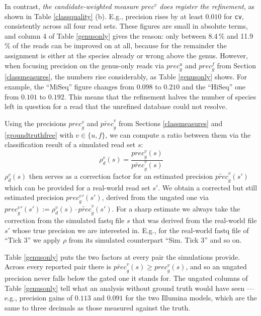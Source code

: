 \documentclass[pdflatex,sn-vancouver-num]{sn-jnl}
\begin{document}
    In contrast, \emph{the candidate-weighted measure $\mathit{prec}^v$ does register the refinement}, as shown in Table \ref{classquality} (b). E.g., precision rises by at least $0.010$ for \texttt{cv}, consistently across all four read sets. These figures are small in absolute terms, and column 4 of Table \ref{genusonly} gives the reason: only between 8.4\,\% and 11.9\,\% of the reads can be improved on at all, because for the remainder the assignment is either at the species already or wrong above the genus. However, when focusing precision on the genus-only reads via $\mathit{prec}^u_g$ and $\mathit{prec}^f_g$ from Section \ref{classmeasures}, the numbers rise considerably, as Table \ref{genusonly} shows. For example, the \enquote{MiSeq} figure changes from $0.098$ to $0.210$ and the \enquote{HiSeq} one from $0.101$ to $0.192$. This means that the refinement halves the number of species left in question for a read that the unrefined database could not resolve.

    Using the precisions $\mathit{prec}^v_g$ and $\widetilde{\mathit{prec}}^v_g$ from Sections \ref{classmeasures} and \ref{groundtruthfree} with $v \in \{u, f\}$, we can compute a ratio between them via the classification result of a simulated read set $s$:
\[ \rho^v_d(s) = \frac{\mathit{prec}^v_g(s)}{\widetilde{\mathit{prec}}^v_g(s)} \]
    $\rho^v_d(s)$ then serves as a correction factor for an estimated precision $\widetilde{\mathit{prec}}^v_g(s')$ which can be provided for a real-world read set $s'$. We obtain a corrected but still estimated precision $\mathit{prec}^{v}_g{}'(s')$, derived from the ungated one via $\mathit{prec}^{v}_g{}'(s') := \rho^v_d(s) \cdot \widetilde{\mathit{prec}}^v_g(s')$. For a sharp estimate we always take the correction from the simulated fastq file $s$ that was derived from the real-world file $s'$ whose true precision we are interested in. E.g., for the real-world fastq file of \enquote{Tick 3} we apply $\rho$ from its simulated counterpart \enquote{Sim. Tick 3} and so on.

    Table \ref{genusonly} puts the two factors at every pair the simulations provide. Across every reported pair there is $\widetilde{\mathit{prec}}^v_g(s) \geq \mathit{prec}^v_g(s)$, and so an ungated precision never falls below the gated one it stands for. The ungated columns of Table \ref{genusonly} tell what an analysis without ground truth would have seen --- e.g., precision gains of $0.113$ and $0.091$ for the two Illumina models, which are the same to three decimals as those measured against the truth.
\end{document}
